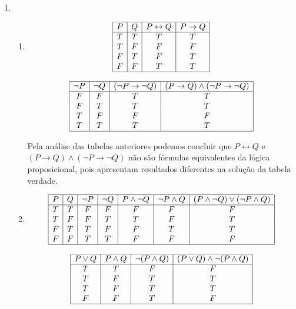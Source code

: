 \begin{enumerate}
\begin{enumerate}
			\end{enumerate}
			
			\item
			\begin{enumerate}
				
				\item 
				\[\begin{array}{|c|c|c|c|}
				\hline
				P & Q & P \leftrightarrow Q & P \to Q \\ \hline
				T & T & T & T \\
				T & F & F & F \\
				F & T & F & T \\
				F & F & T & T \\
				\hline
				\end{array}
				\]
				
				\[\begin{array}{|c|c|c|c|}
				\hline
				\neg P & \neg Q & (\neg P \to \neg Q) & (P \to Q) \land (\neg P \to \neg Q) \\ \hline
				F & F & T & T \\
				F & T & T & T \\
				T & F & F & F \\
				T & T & T & T \\
				\hline
				\end{array}
				\]
				
				Pela an\'alise das tabelas anteriores podemos concluir que  $P \leftrightarrow Q$ e $(P \to Q) \land (\neg P \to \neg Q)$ n\~ao s\~ao f\'ormulas equivalentes da l\'ogica proposicional, pois apresentam resultados diferentes na solu\c{c}\~ao da tabela verdade.
				
				\item
				\[\begin{array}{|c|c|c|c|c|c|c|}
				\hline
				P & Q & \neg P & \neg Q & P \land \neg Q & \neg P \land Q & (P \land \neg Q) \lor (\neg P \land Q) \\ \hline
				T & T & F & F & F & F & F \\
				T & F & F & T & T & F & T \\
				F & T & T & F & F & T & T \\
				F & F & T & T & F & F & F \\
				
				
				\hline
				\end{array}
				\]
				
				\[\begin{array}{|c|c|c|c|}
				\hline
				P \lor Q & P \land Q & \neg (P \land Q)& (P \lor Q) \land \neg (P \land Q) \\ \hline
				T & T & F & F \\
				T & F & T & T \\
				T & F & T & T \\
				F & F & T & F \\
				\hline
				\end{array}
				\]
				

\end{enumerate}
\end{enumerate}
